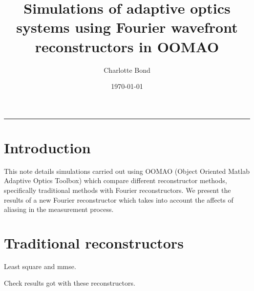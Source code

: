 \documentclass[pdf]{note}
\author{Charlotte Bond}
\title{Simulations of adaptive optics systems using Fourier wavefront reconstructors in OOMAO}
\date{\today}
\begin{document}
\maketitle
\tableofcontents
\vspace{1cm}\hrule \vspace{1cm}

\section{Introduction}

This note details simulations carried out using OOMAO (Object Oriented Matlab Adaptive Optics Toolbox)
which compare different reconstructor methods, specifically traditional methods with Fourier
reconstructors.  We present the results of a new Fourier reconstructor which takes into account
the affects of aliasing in the measurement process.

\section{Traditional reconstructors}

Least square and mmse.

Check results got with these reconstructors.
\end{document}
